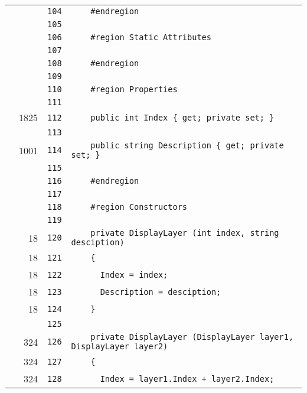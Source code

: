 \documentclass[a4paper,10pt]{article}
\begin{document}
\begin{longtable}[l]{lrrl}
\cellcolor{gray} &  & \verb~104~ & \verb~    #endregion~\\
\cellcolor{gray} &  & \verb~105~ & \verb~~\\
\cellcolor{gray} &  & \verb~106~ & \verb~    #region Static Attributes~\\
\cellcolor{gray} &  & \verb~107~ & \verb~~\\
\cellcolor{gray} &  & \verb~108~ & \verb~    #endregion~\\
\cellcolor{gray} &  & \verb~109~ & \verb~~\\
\cellcolor{gray} &  & \verb~110~ & \verb~    #region Properties~\\
\cellcolor{gray} &  & \verb~111~ & \verb~~\\
\cellcolor{green} & 1825 & \verb~112~ & \verb~    public int Index { get; private set; }~\\
\cellcolor{gray} &  & \verb~113~ & \verb~~\\
\cellcolor{green} & 1001 & \verb~114~ & \verb~    public string Description { get; private set; }~\\
\cellcolor{gray} &  & \verb~115~ & \verb~~\\
\cellcolor{gray} &  & \verb~116~ & \verb~    #endregion~\\
\cellcolor{gray} &  & \verb~117~ & \verb~~\\
\cellcolor{gray} &  & \verb~118~ & \verb~    #region Constructors~\\
\cellcolor{gray} &  & \verb~119~ & \verb~~\\
\cellcolor{green} & 18 & \verb~120~ & \verb~    private DisplayLayer (int index, string desciption)~\\
\cellcolor{green} & 18 & \verb~121~ & \verb~    {~\\
\cellcolor{green} & 18 & \verb~122~ & \verb~      Index = index;~\\
\cellcolor{green} & 18 & \verb~123~ & \verb~      Description = desciption;~\\
\cellcolor{green} & 18 & \verb~124~ & \verb~    }~\\
\cellcolor{gray} &  & \verb~125~ & \verb~~\\
\cellcolor{green} & 324 & \verb~126~ & \verb~    private DisplayLayer (DisplayLayer layer1, DisplayLayer layer2)~\\
\cellcolor{green} & 324 & \verb~127~ & \verb~    {~\\
\cellcolor{green} & 324 & \verb~128~ & \verb~      Index = layer1.Index + layer2.Index;~\\

\end{longtable}
\end{document}
